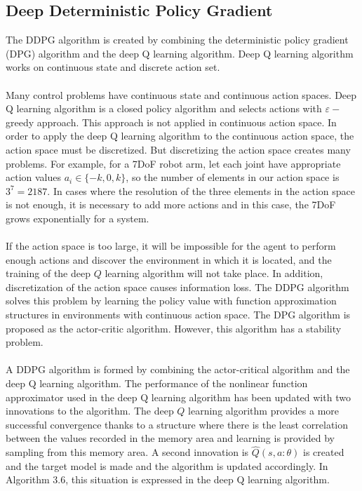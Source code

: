 \documentclass[12pt,twoside,a4]{mwbk}
\begin{document}
\subsection{Deep Deterministic Policy Gradient}
The DDPG algorithm is created by combining the deterministic policy gradient (DPG) algorithm and the deep Q learning algorithm. Deep Q learning algorithm works on continuous state and discrete action set. 
\\ \\
Many control problems have continuous state and continuous action spaces. Deep Q learning algorithm is a closed policy algorithm and selects actions with $\varepsilon-$greedy approach. This approach is not applied in continuous action space. In order to apply the deep Q learning algorithm to the continuous action space, the action space must be discretized. But discretizing the action space creates many problems. For example, for a 7DoF robot arm, let each joint have appropriate action values $a_{i} \in\{-k, 0, k\}$, so the number of elements in our action space is $3^{7}=2187$. In cases where the resolution of the three elements in the action space is not enough, it is necessary to add more actions and in this case, the 7DoF grows exponentially for a system.
\\ \\
If the action space is too large, it will be impossible for the agent to perform enough actions and discover the environment in which it is located, and the training of the deep $Q$ learning algorithm will not take place. In addition, discretization of the action space causes information loss. The DDPG algorithm solves this problem by learning the policy value with function approximation structures in environments with continuous action space. The DPG algorithm is proposed as the actor-critic algorithm. However, this algorithm has a stability problem. 
\\ \\
A DDPG algorithm is formed by combining the actor-critical algorithm and the deep Q learning algorithm. The performance of the nonlinear function approximator used in the deep $\mathrm{Q}$ learning algorithm has been updated with two innovations to the algorithm. The deep $Q$ learning algorithm provides a more successful convergence thanks to a structure where there is the least correlation between the values recorded in the memory area and learning is provided by sampling from this memory area. A second innovation is $\hat{Q}(s, a: \theta)$ is created and the target model is made and the algorithm is updated accordingly. In Algorithm 3.6, this situation is expressed in the deep Q learning algorithm. 
\end{document}
